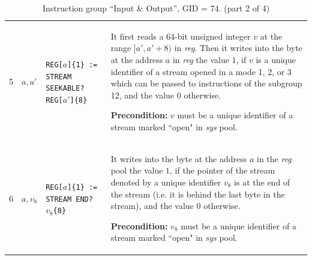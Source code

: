 \documentclass[10pt,twocolumn]{article}
\begin{document}
\begin{table}[!h]
\begin{center}
\begin{tabular}{lp{1.2cm}p{5.5cm}p{7.5cm}}
5 & $ a,a' $ %
& \texttt{REG[}$ a $\texttt{]\{1\} := STREAM SEEKABLE?  REG[}$ a'
$\texttt{]\{8\}} %
& It first reads a 64-bit unsigned integer $ v $ at the range $ [a',a'+8) $ in
\textit{reg}. Then it writes into the byte at the address $ a $ in \textit{reg}
the value $ 1 $, if $ v $ is a unique identifier of a stream opened in a mode 1,
2, or 3 which can be passed to instructions of the subgroup 12, and the value $
0 $ otherwise.

\textbf{Precondition:} $ v $ must be a unique identifier of a stream marked
``open" in \textit{sys} pool. \\

6 & $ a,v_8 $ %
& \texttt{REG[}$ a $\texttt{]\{1\} := STREAM END? }$ v_8 $\texttt{\{8\}} %
& It writes into the byte at the address $ a $ in the \textit{reg} pool the value $
1 $, if the pointer of the stream denoted by a unique identifier $ v_8 $ is at
the end of the stream (i.e. it is behind the last byte in the stream), and the
value $ 0 $ otherwise.

\textbf{Precondition:} $ v_8 $ must be a unique identifier of a stream marked
``open" in \textit{sys} pool. \\

\end{tabular}
\end{center}
\caption{Instruction group ``Input \& Output'', GID = 74. (part 2 of 4)}
\end{table}
\end{document}
